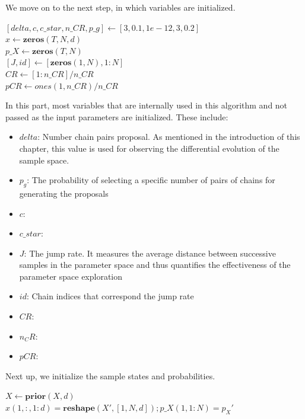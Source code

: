 We move on to the next step, in which variables are initialized.\\

\begin{algorithm}[H]
$[delta, c, c\_star, n\_CR, p\_g] \gets [3, 0.1, 1e-12, 3, 0.2]$\\
$x \gets \textbf{zeros}(T, N, d)$\\
$p\_X \gets \textbf{zeros}(T, N)$\\
$[J, id] \gets [\textbf{zeros}(1, N), 1:N]$\\
$CR \gets [1:n\_CR] / n\_CR$\\
$pCR \gets ones(1, n\_CR) / n\_CR$\\
\end{algorithm}

In this part, most variables that are internally used in this algorithm and not passed as the input parameters are initialized. These include:
\begin{itemize}
    \item $delta$: Number chain pairs proposal. As mentioned in the introduction of this chapter, this value is used for observing the differential evolution of the sample space.
    \item $p_g$: The probability of selecting a specific number of pairs of chains for generating the proposals
    \item $c$: 
    \item $c\_star$: 
    \item $J$: The jump rate. It measures the average distance between successive samples in the parameter space and thus quantifies the effectiveness of the parameter space exploration
    \item $id$: Chain indices that correspond the jump rate
    \item $CR$: 
    \item $n_CR$:
    \item $pCR$: 
\end{itemize}

Next up, we initialize the sample states and probabilities.\\
\begin{algorithm}[H]
$X \gets \textbf{prior}(X, d)$\\
$x(1, :, 1:d) = \textbf{reshape}(X', [1, N, d]); p\_X(1, 1:N) = p_X'$
\end{algorithm}


